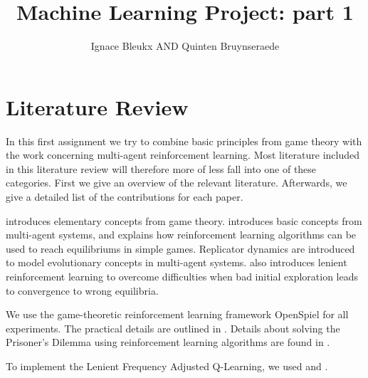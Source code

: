 \documentclass[10pt,a4paper]{article}
\author{Ignace Bleukx AND Quinten Bruynseraede}
\title{Machine Learning Project: part 1}
\begin{document}
\maketitle

\section{Literature Review}
In this first assignment we try to combine basic principles from game theory with the work concerning multi-agent reinforcement learning. Most literature included in this literature review will therefore more of less fall into one of these categories. First we give an overview of the relevant literature. Afterwards, we give a detailed list of the contributions for each paper.

\citet{mas} introduces elementary concepts from game theory. \citet{phdthesis} introduces basic concepts from multi-agent systems, and explains how reinforcement learning algorithms can be used to reach equilibriums in simple games. Replicator dynamics are introduced to model evolutionary concepts in multi-agent systems. \citet{phdthesis} also introduces lenient reinforcement learning to overcome difficulties when bad initial exploration leads to convergence to wrong equilibria.

We use the game-theoretic reinforcement learning framework OpenSpiel for all experiments. The practical details are outlined in \citet{lanctot2019openspiel}. Details about solving the Prisoner's Dilemma using reinforcement learning algorithms are found in \citet{rlforpd}.

To implement the Lenient Frequency Adjusted Q-Learning, we used \citet{evoldynamics} and \citet{extrepl}.
\end{document}
